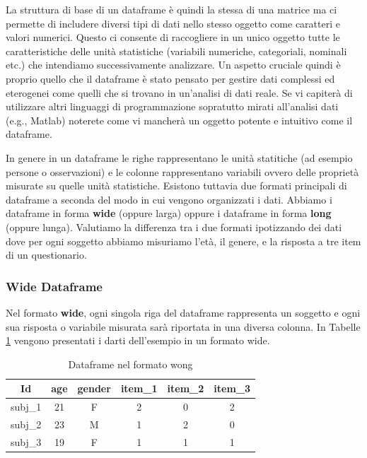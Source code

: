 \documentclass[
]{book}
\begin{document}
La struttura di base di un dataframe è quindi la stessa di una matrice ma ci permette di includere diversi tipi di dati nello stesso oggetto come caratteri e valori numerici. Questo ci consente di raccogliere in un unico oggetto tutte le caratteristiche delle unità statistiche (variabili numeriche, categoriali, nominali etc.) che intendiamo successivamente analizzare. Un aspetto cruciale quindi è proprio quello che il dataframe è stato pensato per gestire dati complessi ed eterogenei come quelli che si trovano in un'analisi di dati reale. Se vi capiterà di utilizzare altri linguaggi di programmazione sopratutto mirati all'analisi dati (e.g., Matlab) noterete come vi mancherà un oggetto potente e intuitivo come il dataframe.

In genere in un dataframe le righe rappresentano le unità statitiche (ad esempio persone o osservazioni) e le colonne rappresentano variabili ovvero delle proprietà misurate su quelle unità statistiche. Esistono tuttavia due formati principali di dataframe a seconda del modo in cui vengono organizzati i dati. Abbiamo i dataframe in forma \textbf{wide} (oppure larga) oppure i dataframe in forma \textbf{long} (oppure lunga). Valutiamo la differenza tra i due formati ipotizzando dei dati dove per ogni soggetto abbiamo misuriamo l'età, il genere, e la risposta a tre item di un questionario.

\hypertarget{wide-dataframe}{%
\subsubsection*{Wide Dataframe}\label{wide-dataframe}}

Nel formato \textbf{wide}, ogni singola riga del dataframe rappresenta un soggetto e ogni sua risposta o variabile misurata sarà riportata in una diversa colonna. In Tabelle \ref{tab:table-wide-db} vengono presentati i darti dell'esempio in un formato wide.

\begin{table}

\caption{\label{tab:table-wide-db}Dataframe nel formato wong}
\centering
\begin{tabular}[t]{c|c|c|c|c|c}
\hline
Id & age & gender & item\_1 & item\_2 & item\_3\\
\hline
subj\_1 & 21 & F & 2 & 0 & 2\\
\hline
subj\_2 & 23 & M & 1 & 2 & 0\\
\hline
subj\_3 & 19 & F & 1 & 1 & 1\\
\hline
\end{tabular}
\end{table}
\end{document}
